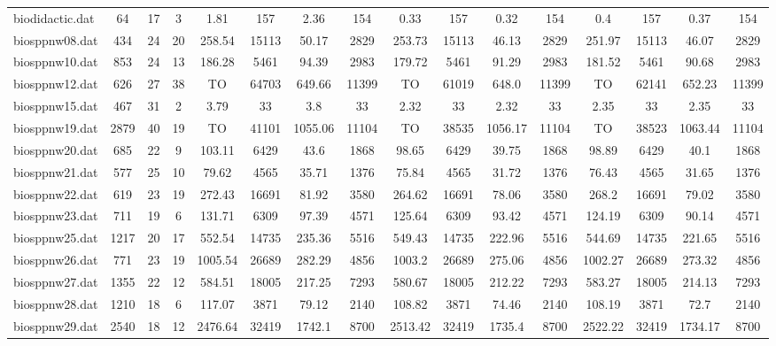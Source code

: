 \begin{sidewaystable}[!ht]
{\begin{tabular}{lccccccccccccccc}
biodidactic.dat & 64 & 17 & 3 & 1.81 & 157 & 2.36 & 154 & 0.33 & 157 &  \textcolor{blue2}{0.32} & 154 & 0.4 & 157 & 0.37 & 154 \\
biosppnw08.dat & 434 & 24 & 20 & 258.54 & 15113 & 50.17 & 2829 & 253.73 & 15113 & 46.13 & 2829 & 251.97 & 15113 & 46.07 & 2829 \\
biosppnw10.dat & 853 & 24 & 13 & 186.28 & 5461 & 94.39 & 2983 & 179.72 & 5461 & 91.29 & 2983 & 181.52 & 5461 & 90.68 & 2983 \\
biosppnw12.dat & 626 & 27 & 38 &  TO & 64703 & 649.66 & 11399 &  TO & 61019 & 648.0 & 11399 &  TO & 62141 & 652.23 & 11399 \\
biosppnw15.dat & 467 & 31 & 2 & 3.79 & 33 & 3.8 & 33 &  \textcolor{blue2}{2.32} & 33 &  \textcolor{blue2}{2.32} & 33 & 2.35 & 33 & 2.35 & 33 \\
biosppnw19.dat & 2879 & 40 & 19 &  TO & 41101 &  \textcolor{blue2}{1055.06} & 11104 &  TO & 38535 & 1056.17 & 11104 &  TO & 38523 & 1063.44 & 11104 \\
biosppnw20.dat & 685 & 22 & 9 & 103.11 & 6429 & 43.6 & 1868 & 98.65 & 6429 &  \textcolor{blue2}{39.75} & 1868 & 98.89 & 6429 & 40.1 & 1868 \\
biosppnw21.dat & 577 & 25 & 10 & 79.62 & 4565 & 35.71 & 1376 & 75.84 & 4565 & 31.72 & 1376 & 76.43 & 4565 & 31.65 & 1376 \\
biosppnw22.dat & 619 & 23 & 19 & 272.43 & 16691 & 81.92 & 3580 & 264.62 & 16691 &  \textcolor{blue2}{78.06} & 3580 & 268.2 & 16691 & 79.02 & 3580 \\
biosppnw23.dat & 711 & 19 & 6 & 131.71 & 6309 & 97.39 & 4571 & 125.64 & 6309 & 93.42 & 4571 & 124.19 & 6309 & 90.14 & 4571 \\
biosppnw25.dat & 1217 & 20 & 17 & 552.54 & 14735 & 235.36 & 5516 & 549.43 & 14735 & 222.96 & 5516 & 544.69 & 14735 & 221.65 & 5516 \\
biosppnw26.dat & 771 & 23 & 19 & 1005.54 & 26689 & 282.29 & 4856 & 1003.2 & 26689 & 275.06 & 4856 & 1002.27 & 26689 & 273.32 & 4856 \\
biosppnw27.dat & 1355 & 22 & 12 & 584.51 & 18005 & 217.25 & 7293 & 580.67 & 18005 & 212.22 & 7293 & 583.27 & 18005 & 214.13 & 7293 \\
biosppnw28.dat & 1210 & 18 & 6 & 117.07 & 3871 & 79.12 & 2140 & 108.82 & 3871 & 74.46 & 2140 & 108.19 & 3871 & 72.7 & 2140 \\
biosppnw29.dat & 2540 & 18 & 12 & 2476.64 & 32419 & 1742.1 & 8700 & 2513.42 & 32419 & 1735.4 & 8700 & 2522.22 & 32419 & 1734.17 & 8700 \\

\end{tabular}}
\end{sidewaystable}
